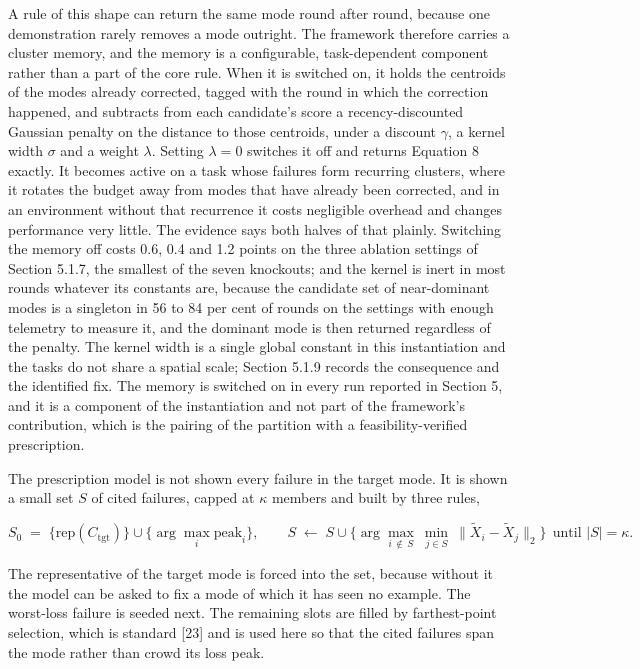 \documentclass[
  11pt,
]{article}
\begin{document}
A rule of this shape can return the same mode round after round, because
one demonstration rarely removes a mode outright. The framework
therefore carries a cluster memory, and the memory is a configurable,
task-dependent component rather than a part of the core rule. When it is
switched on, it holds the centroids of the modes already corrected,
tagged with the round in which the correction happened, and subtracts
from each candidate's score a recency-discounted Gaussian penalty on the
distance to those centroids, under a discount \(\gamma\), a kernel width
\(\sigma\) and a weight \(\lambda\). Setting \(\lambda = 0\) switches it
off and returns Equation 8 exactly. It becomes active on a task whose
failures form recurring clusters, where it rotates the budget away from
modes that have already been corrected, and in an environment without
that recurrence it costs negligible overhead and changes performance
very little. The evidence says both halves of that plainly. Switching
the memory off costs 0.6, 0.4 and 1.2 points on the three ablation
settings of Section 5.1.7, the smallest of the seven knockouts; and the
kernel is inert in most rounds whatever its constants are, because the
candidate set of near-dominant modes is a singleton in 56 to 84 per cent
of rounds on the settings with enough telemetry to measure it, and the
dominant mode is then returned regardless of the penalty. The kernel
width is a single global constant in this instantiation and the tasks do
not share a spatial scale; Section 5.1.9 records the consequence and the
identified fix. The memory is switched on in every run reported in
Section 5, and it is a component of the instantiation and not part of
the framework's contribution, which is the pairing of the partition with
a feasibility-verified prescription.

The prescription model is not shown every failure in the target mode. It
is shown a small set \(S\) of cited failures, capped at \(\kappa\)
members and built by three rules,

\[S_0 \;=\; \big\{\mathrm{rep}(C_{\mathrm{tgt}})\big\} \cup \big\{\arg\max_i \mathrm{peak}_i\big\}, \qquad S \;\leftarrow\; S \cup \Big\{ \arg\max_{i \,\notin\, S} \ \min_{j \in S} \ \big\| \tilde{X}_i - \tilde{X}_j \big\|_2 \Big\} \ \ \text{until } |S| = \kappa. \tag{9}\]

The representative of the target mode is forced into the set, because
without it the model can be asked to fix a mode of which it has seen no
example. The worst-loss failure is seeded next. The remaining slots are
filled by farthest-point selection, which is standard {[}23{]} and is
used here so that the cited failures span the mode rather than crowd its
loss peak.
\end{document}
